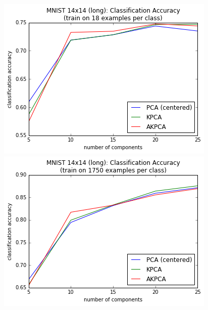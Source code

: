 \documentclass[]{article}
\begin{document}
\begin{figure}[h]
\begin{center}
\includegraphics[scale=0.5]{figures/mnist_14_long_classify_18}
\includegraphics[scale=0.5]{figures/mnist_14_long_classify_1750}


\end{center}
\end{figure}
\end{document}

